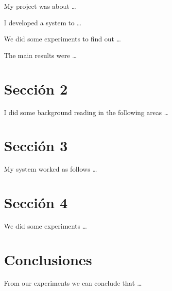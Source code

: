\documentclass[a4paper, 11pt]{article}
\begin{document}
My project was about \ldots

I developed a system to \ldots

We did some experiments to find out \ldots

The main results were \ldots

\pagebreak

\section{Sección 2}

I did some background reading in the following areas \ldots

\pagebreak

\section{Sección 3}

My system worked as follows \ldots

\pagebreak

\section{Sección 4}

We did some experiments \ldots

\pagebreak

\section{Conclusiones}

From our experiments we can conclude that \ldots


\end{document}
